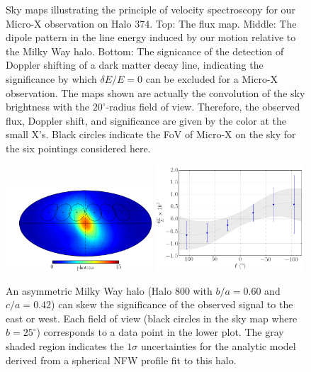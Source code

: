 \documentclass[aps,prd,10pt,twocolumn,superscriptaddress,showpacs,footinbib]{revtex4-1}
\begin{document}
\begin{figure}[h!]
\caption{Sky maps illustrating the principle of velocity spectroscopy for our Micro-X observation on
	Halo 374. Top: The flux map. Middle:
	The dipole pattern in the line energy induced by our motion relative to the Milky Way halo.
	Bottom: The signicance of the detection of Doppler shifting of a dark matter decay line,
indicating the significance by which $\delta E/E=0$ can be excluded for a Micro-X
observation. The maps shown are actually the convolution of the sky brightness with the
$20^\circ$-radius field of view. Therefore, the observed flux, Doppler shift, and significance are
given by the color at the small X's.
Black circles indicate the
FoV of Micro-X on the sky for the six pointings considered here. }
\label{fig:skymaps}
\end{figure}




\begin{figure}[!thpb]
\centering
	\includegraphics[width=0.49\textwidth]{flux_map_800.png}
	\includegraphics[width=0.49\textwidth]{de_vs_l_800.png}
\caption{An asymmetric Milky Way halo (Halo 800 with $b/a = 0.60$ and $c/a = 0.42$) can skew the significance of the
	observed signal to the east or west. Each field of view (black circles in the sky map where $b = 25^\circ$) corresponds to a data point in
the lower plot. The gray shaded region indicates the $1\sigma$ uncertainties for the analytic model
derived from a spherical NFW profile fit to this halo.}
\label{fig:triax}
\end{figure}
\end{document}
